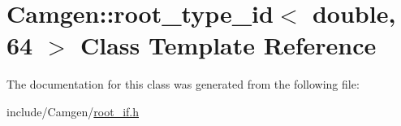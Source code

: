 \hypertarget{a00473}{\section{Camgen\-:\-:root\-\_\-type\-\_\-id$<$ double, 64 $>$ Class Template Reference}
\label{a00473}
}


The documentation for this class was generated from the following file\-:\begin{DoxyCompactItemize}
\item 
include/\-Camgen/\hyperlink{a00732}{root\-\_\-if.\-h}\end{DoxyCompactItemize}
